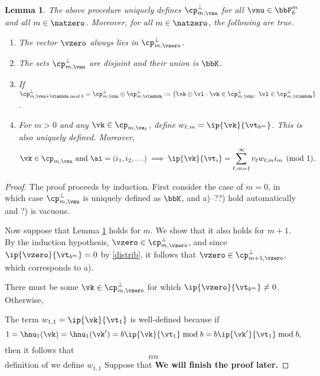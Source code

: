 \documentclass[]{elsarticle}
\newtheorem{lem}{Lemma}
\theoremstyle{definition}
\begin{document}
\begin{lem} \label{cosetlem} The above procedure uniquely defines $\cp_{m,\vnu}^{\perp}$  for all $\vnu \in \bbF_b^m$ and all $m \in \natzero$.  Moreover, for all $m \in \natzero$, the following are true.
\begin{enumerate}
\renewcommand{\labelenumi}{\alph{enumi})}

\item The vector $\vzero$ always lies in $\cp_{m,\vzero}^{\perp}$.

\item The sets $\cp_{m,\vnu}^{\perp}$ are disjoint and their union is $\bbK$.

\item If $\cp_{m,\vnu + \vlambda \bmod b}^{\perp} = \cp_{m,\vnu}^{\perp} \oplus \cp_{m,\vlambda}^{\perp} := \{\vk \oplus \vl :  \vk \in \cp_{m,\vnu}^{\perp},\ \vl \in \cp_{m,\vlambda}^{\perp}\}$.

\item For $m>0$ and any $\vk \in \cp_{m,\ve_\ell}$, define $w_{\ell,m}=\ip{\vk}{\vt_{b^m}}$.  This is also uniquely defined.  Moreover,
\begin{equation} \label{nuwisum}
\vk\in \cp_{m,\vnu} \text{ and } \ai=(i_1, i_2, \ldots) \implies{} \ip{\vk}{\vt_i} = \sum_{\ell,m=1}^{\infty} \nu_\ell w_{\ell,m} i_m \pmod 1.
\end{equation}

\end{enumerate}
\end{lem}




\begin{proof} The proof proceeds by induction.  First consider the case of $m=0$, in which case $\cp_{m,\vnu}^{\perp}$ is uniquely defined as $\bbK$, and a)--??) hold automatically and ?) is vacuous. 

Now suppose that Lemma \ref{cosetlem} holds for $m$.  We show that it also holds for $m+1$.  By the induction hypothesis, $\vzero \in \cp_{m,\vzero}^{\perp}$, and since $\ip{\vzero}{\vt_{b^{m}}}=0$ by \eqref{distrib}, it follows that $\vzero \in \cp_{m+1,\vzero}^{\perp}$, which corresponds to a).

There must be some $\vk \in  \cp_{m,\vzero}^{\perp}$ for which $\ip{\vzero}{\vt_{b^{m}}}\ne 0$.  Otherwise,  












The term $w_{1,1} = \ip{\vk}{\vt_{1}}$ is well-defined because if 
\[
1=\hnu_1(\vk)=\hnu_1(\vk')=b \ip{\vk}{\vt_{1}} \bmod b = b \ip{\vk'}{\vt_{1}} \bmod b,
\]
then it follows that 
\[
nn
\]
 definition of  we define $w_{1,1}$ Suppose that 
{\bf We will finish the proof later.}
\end{proof}
\end{document}
